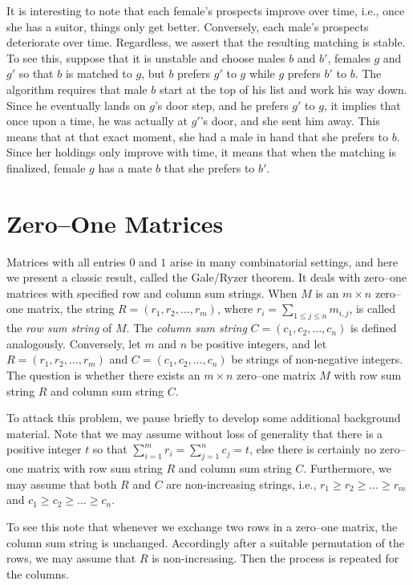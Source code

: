 It is interesting to note that each female's prospects improve over time, i.e.,
once she has a suitor, things only get better.  Conversely, each male's
prospects deteriorate over time.  Regardless, we assert that the resulting
matching is stable.  To see this, suppose that it is unstable and
choose males $b$ and $b'$, females $g$ and $g'$ so that $b$ is matched
to $g$, but $b$ prefers $g'$ to $g$ while $g$ prefers $b'$ to $b$.  The
algorithm requires that male $b$ start at the top of his list and
work his way down.  Since he eventually lands on $g$'s door step, and
he prefers $g'$ to $g$, it implies that once upon a time, he was
actually at $g'$'s door, and she sent him away.  This means that at that
exact moment, she had a male in hand that she prefers to $b$.  Since
her holdings only improve with time, it means that when the matching
is finalized, female $g$ has a mate $b$ that she prefers to $b'$.

\section{Zero--One Matrices}\label{s:kitchensink:zero-one-matrices}

Matrices with all entries $0$ and $1$ arise in many combinatorial
settings, and here we present a classic result, called the Gale/Ryzer
theorem.  It deals with zero--one matrices with specified row and
column sum strings.  When $M$ is an $m\times n$ zero--one matrix, the
string $R=(r_1,r_2,\dots,r_m)$, where $r_i=\sum_{1\le j\le n}m_{i,j}$,
is called the \textit{row sum string} of $M$. The \textit{column sum string}
$C=(c_1,c_2,\dots,c_n)$ is defined analogously.  Conversely,  let $m$ 
and $n$ be positive integers, and let $R=(r_1,r_2,\dots,r_m)$ and 
$C=(c_1,c_2,\dots,c_n)$ be strings of non-negative integers.  The 
question is whether there exists an $m\times n$ zero--one matrix 
$M$ with row sum string $R$ and column sum string $C$.

To attack this problem, we pause briefly to develop some additional
background material.  Note that we may assume without loss of
generality that there is a positive integer $t$ so that 
$\sum_{i=1}^mr_i=\sum_{j=1}^nc_j=t$, else there is certainly
no zero--one matrix with row sum string $R$ and column sum string $C$.
Furthermore, we may assume that both $R$ and $C$ are non-increasing strings, 
i.e., $r_1\ge r_2\ge \dots\ge r_m$ and $c_1\ge c_2\ge\dots\ge c_n$.  

To see this note that whenever we exchange two rows in a zero--one matrix,
the column sum string is unchanged.   Accordingly after a suitable
permutation of the rows, we may assume that $R$ is non-increasing.
Then the process is repeated for the columns.

